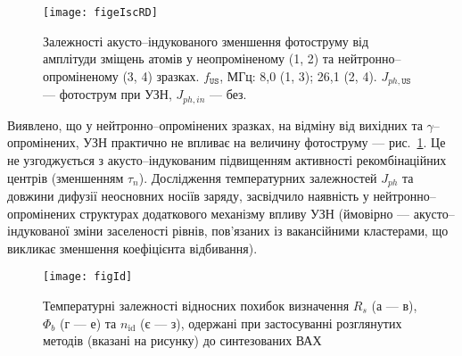\begin{figure}[ht]
\center
\texttt{[image: figeIscRD]}
\caption{\label{figeIscRD}
Залежності акусто--індукованого зменшення фотоструму від
амплітуди зміщень атомів у неопроміненому (1, 2)
та нейтронно--опроміненому (3, 4) зразках.
$f_\mathtt{US}$, МГц: 8,0 (1, 3);
26,1 (2, 4).
$J_{ph,\mathtt{US}}$ --- фотострум при УЗН,
$J_{ph,in}$ --- без.
}%
\end{figure}

Виявлено, що у нейтронно--опромінених зразках, на відміну від вихідних та  $\gamma$--опромінених, УЗН практично не впливає на величину фотоструму --- рис.~\ref{figeIscRD}.
Це не узгоджується з акусто--індукованим підвищенням активності рекомбінаційних центрів (зменшенням $\tau_n$).
Дослідження температурних залежностей $J_{ph}$ та довжини дифузії неосновних носіїв заряду,
засвідчило наявність у нейтронно--опромінених структурах додаткового механізму впливу УЗН (ймовірно --- акусто--індукованої зміни заселеності рівнів, пов'язаних із вакансійними кластерами, що викликає зменшення коефіцієнта відбивання).


\begin{figure}
\center
\texttt{[image: figId]}%
\caption{\label{figId}
Температурні залежності відносних похибок визначення $R_s$ (а --- в), $\Phi_b$ (г --- е) та $n_\mathrm{id}$ (є --- з), одержані при застосуванні розглянутих методів (вказані на рисунку) до синтезованих ВАХ
}
\end{figure}

